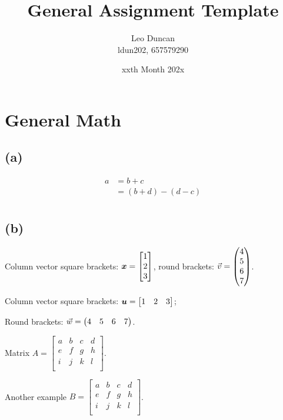 \documentclass[11pt, a4paper]{article}
\title{General Assignment Template}
\author{Leo Duncan \\ ldun202, 657579290}
\date{xxth Month 202x}
\begin{document}
\maketitle

\section{General Math}

\subsection{(a)} %

\begin{equation*}
    \begin{split}
        a &= b + c \\
        &= (b + d) - (d - c) \\
    \end{split}
\end{equation*}

\subsection{(b)} %

Column vector square brackets: $\bm{x} = \begin{bmatrix}1\\2\\3\end{bmatrix}$, round brackets: $\vec{v} = \begin{pmatrix}4\\5\\6\\7\end{pmatrix}$.

Column vector square brackets: $\bm{u} = \begin{bmatrix}1&2&3\end{bmatrix}$;

Round brackets: $\vec{w} = \begin{pmatrix}4&5&6&7\end{pmatrix}$.

Matrix $A = \left[\begin{array}{cccc}
    a & b & c & d \\
    e & f & g & h \\
    i & j & k & l \\
\end{array}\right]$.

Another example $B = \left[\begin{array}{ccc|c}
    a & b & c & d \\
    e & f & g & h \\
    i & j & k & l \\
\end{array}\right]$.
\end{document}
